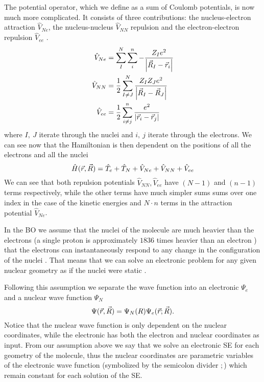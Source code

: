 \documentclass[../master_thesis.tex]{subfiles}
\begin{document}
The potential operator, which we define as a sum of Coulomb potentials, is now much more
complicated. It consists of three contributions: the nucleus-electron attraction
$\hat{V}_{Ne}$, the nucleus-nucleus $\hat{V}_{NN}$ repulsion and the electron-electron
repulsion $\hat{V}_{ee}$ \cite{Cramer:2004}.
\begin{align}
  \hat{V}_{Ne} &= \sum^N_I\sum^n_{i}-\frac{Z_Ie^2}{\abs{\vec{R}_I - \vec{r}_i}}\\
  \hat{V}_{NN} &= \frac{1}{2}\sum^N_{I \neq J}\frac{Z_IZ_Je^2}{\abs{\vec{R}_I - \vec{R}_J}}\\
  \hat{V}_{ee} &= \frac{1}{2}\sum^n_{i \neq j} \frac{e^2}{\abs{\vec{r}_i - \vec{r}_j}}
\end{align}
where $I,\ J$ iterate through the nuclei and $i, \ j$ iterate through the electrons.
We can see now that the Hamiltonian is then dependent on the positions of all the electrons and all
the nuclei \cite{Jensen:2017}
\begin{equation}
  \hat{H}(\vec{r}, \vec{R}) = \hat{T}_e + \hat{T}_N + \hat{V}_{Ne} +\hat{V}_{NN} + \hat{V}_{ee}
\end{equation}
We can see that both repulsion potentials $\hat{V}_{NN}, \hat{V}_{ee}$ have $(N - 1)$ and $(n - 1)$ terms
 respectively, while the other terms have much simpler sums {sums over one index in the case of the
kinetic energies and $N\cdot n$ terms in the attraction potential $\hat{V}_{Ne}$}.

In the \ac{BO}  we assume that the nuclei of the molecule are much heavier
than the electrons (a single proton is approximately $1836$ times heavier
than an electron \cite{NIST:2019}) that the electrons can instantaneously respond to
any change in the configuration of the nuclei \cite{Atkins:2011}. That means that we can solve an
electronic problem for any given nuclear geometry as if the nuclei were static
\cite{Cramer:2004, Jensen:2017, Atkins:2014}.

Following this  assumption we separate the wave function into an electronic
$\Psi_e$ and a nuclear wave function $\Psi_N$
\begin{equation}
  \Psi(\vec{r}, \vec{R}) = \Psi_N(R)\Psi_e(\vec{r}; \vec{R}).
\end{equation}
Notice that the nuclear wave function is only dependent on the nuclear coordinates,
while the electronic has both the electron and nuclear coordinates as input. From
our assumption above we say that we solve an electronic \ac{SE} for each geometry
of the molecule, thus the nuclear coordinates  are parametric variables of
the electronic wave function (symbolized by the semicolon divider $;$) which remain
constant for each solution of the \ac{SE}.
\end{document}
